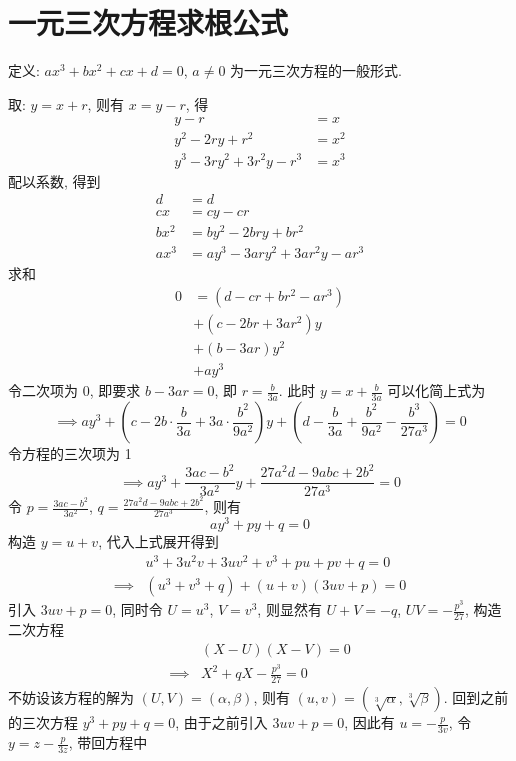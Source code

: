 \section{一元三次方程求根公式}

定义: $ax^3 + bx^2 + cx + d = 0$, $a \ne 0$ 为一元三次方程的一般形式.

取: $y = x + r$, 则有 $x = y - r$, 得
\[ \begin{aligned}
    y - r &= x \\
    y^2 - 2ry + r^2 &= x^2 \\
    y^3 - 3ry^2 + 3r^2y - r^3 &= x^3
\end{aligned} \]
配以系数, 得到
\[ \begin{aligned}
    d &= d \\
    cx &= cy - cr \\
    bx^2 &= by^2 - 2bry + br^2 \\
    ax^3 &= ay^3 - 3ary^2 + 3ar^2y - ar^3
\end{aligned} \]
求和
\[ \begin{aligned}
    0 &= (d - cr + br^2 - ar^3) \\
    &+ (c - 2br + 3ar^2) y \\
    &+ (b - 3ar) y^2 \\
    &+ ay^3
\end{aligned} \]
令二次项为 0, 即要求 $b - 3ar = 0$, 即 $r = \frac{b}{3a}$. 此时 $y = x + \frac{b}{3a}$ 可以化简上式为
\[
    \implies ay^3 + (c - 2b \cdot \frac{b}{3a} + 3a \cdot \frac{b^2}{9a^2}) y
    + (d - \frac{b}{3a} + \frac{b^2}{9a^2} - \frac{b^3}{27a^3}) = 0
\]
令方程的三次项为 1
\[
    \implies ay^3 + \frac{3ac-b^2}{3a^2} y + \frac{27a^2d - 9abc + 2b^2}{27a^3} = 0
\]
令 $p = \frac{3ac-b^2}{3a^2}$, $q = \frac{27a^2d - 9abc + 2b^2}{27a^3}$, 则有
\[
    ay^3 + p y + q = 0
\]
构造 $y = u + v$, 代入上式展开得到
\[ \begin{aligned}
    & u^3 + 3u^2v + 3uv^2 + v^3 + pu + pv + q = 0 \\
    \implies & (u^3 + v^3 + q) + (u + v)(3uv + p) = 0
\end{aligned} \]
引入 $3uv + p = 0$, 同时令 $U = u^3$, $V = v^3$, 则显然有 $U + V = -q$, $UV = -\frac{p^3}{27}$, 构造二次方程
\[ \begin{aligned}
    & (X - U)(X - V) = 0 \\
    \implies & X^2 + qX - \frac{p^3}{27} = 0
\end{aligned} \]
不妨设该方程的解为 $(U, V) = (\alpha, \beta)$, 则有 $(u, v) = (\sqrt[3]{\alpha}, \sqrt[3]{\beta})$. 回到之前的三次方程 $y^3 + py + q = 0$, 由于之前引入 $3uv + p = 0$, 因此有 $u = -\frac{p}{3v}$, 令 $y = z - \frac{p}{3z}$, 带回方程中
